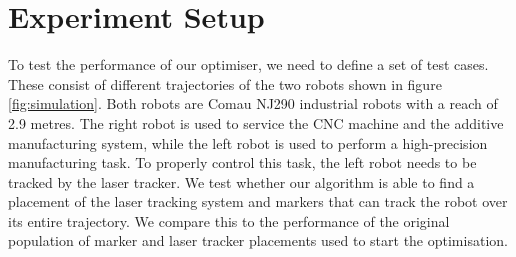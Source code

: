 \documentclass{svproc}
\begin{document}
\section{Experiment Setup}
To test the performance of our optimiser, we need to define a set of test cases.
These consist of different trajectories of the two robots shown in figure \ref{fig:simulation}.
Both robots are Comau NJ290 industrial robots with a reach of 2.9 metres.
The right robot is used to service the CNC machine and the additive manufacturing system, while the left robot is used to perform a high-precision manufacturing task.
To properly control this task, the left robot needs to be tracked by the laser tracker.
We test whether our algorithm is able to find a placement of the laser tracking system and markers that can track the robot over its entire trajectory.
We compare this to the performance of the original population of marker and laser tracker placements used to start the optimisation.
\end{document}
